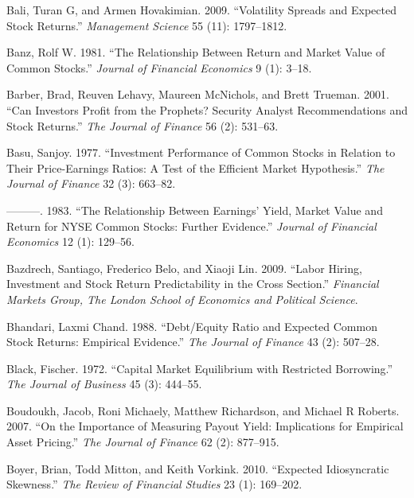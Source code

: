 \documentclass[
  letterpaper,
  DIV=11,
  numbers=noendperiod]{scrreprt}
\newlength{\cslhangindent}
\newlength{\cslentryspacingunit} %
\newenvironment{CSLReferences}[2] %
 {%
  \setlength{\parindent}{0pt}
  \ifodd #1
  \let\oldpar\par
  \def\par{\hangindent=\cslhangindent\oldpar}
  \fi
  \setlength{\parskip}{#2\cslentryspacingunit}
 }%
 {}
\begin{document}
\begin{CSLReferences}{1}{0}
\leavevmode{}%
Bali, Turan G, and Armen Hovakimian. 2009. {``Volatility Spreads and
Expected Stock Returns.''} \emph{Management Science} 55 (11):
1797--1812.

\leavevmode{}%
Banz, Rolf W. 1981. {``The Relationship Between Return and Market Value
of Common Stocks.''} \emph{Journal of Financial Economics} 9 (1): 3--18.

\leavevmode{}%
Barber, Brad, Reuven Lehavy, Maureen McNichols, and Brett Trueman. 2001.
{``Can Investors Profit from the Prophets? Security Analyst
Recommendations and Stock Returns.''} \emph{The Journal of Finance} 56
(2): 531--63.

\leavevmode{}%
Basu, Sanjoy. 1977. {``Investment Performance of Common Stocks in
Relation to Their Price-Earnings Ratios: A Test of the Efficient Market
Hypothesis.''} \emph{The Journal of Finance} 32 (3): 663--82.

\leavevmode{}%
---------. 1983. {``The Relationship Between Earnings' Yield, Market
Value and Return for NYSE Common Stocks: Further Evidence.''}
\emph{Journal of Financial Economics} 12 (1): 129--56.

\leavevmode{}%
Bazdrech, Santiago, Frederico Belo, and Xiaoji Lin. 2009. {``Labor
Hiring, Investment and Stock Return Predictability in the Cross
Section.''} \emph{Financial Markets Group, The London School of
Economics and Political Science}.

\leavevmode{}%
Bhandari, Laxmi Chand. 1988. {``Debt/Equity Ratio and Expected Common
Stock Returns: Empirical Evidence.''} \emph{The Journal of Finance} 43
(2): 507--28.

\leavevmode{}%
Black, Fischer. 1972. {``Capital Market Equilibrium with Restricted
Borrowing.''} \emph{The Journal of Business} 45 (3): 444--55.

\leavevmode{}%
Boudoukh, Jacob, Roni Michaely, Matthew Richardson, and Michael R
Roberts. 2007. {``On the Importance of Measuring Payout Yield:
Implications for Empirical Asset Pricing.''} \emph{The Journal of
Finance} 62 (2): 877--915.

\leavevmode{}%
Boyer, Brian, Todd Mitton, and Keith Vorkink. 2010. {``Expected
Idiosyncratic Skewness.''} \emph{The Review of Financial Studies} 23
(1): 169--202.


\end{CSLReferences}
\end{document}
